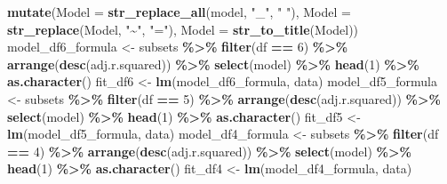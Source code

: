 \documentclass[
  english,
  man,floatsintext]{apa6}
\newenvironment{Shaded}{\begin{snugshade}}{\end{snugshade}}
\newcommand{\DataTypeTok}[1]{\textcolor[rgb]{0.13,0.29,0.53}{#1}}
\newcommand{\DecValTok}[1]{\textcolor[rgb]{0.00,0.00,0.81}{#1}}
\newcommand{\KeywordTok}[1]{\textcolor[rgb]{0.13,0.29,0.53}{\textbf{#1}}}
\newcommand{\NormalTok}[1]{#1}
\newcommand{\OperatorTok}[1]{\textcolor[rgb]{0.81,0.36,0.00}{\textbf{#1}}}
\newcommand{\StringTok}[1]{\textcolor[rgb]{0.31,0.60,0.02}{#1}}
\begin{document}
\begin{Shaded}
\begin{Highlighting}[]
\StringTok{  }\KeywordTok{mutate}\NormalTok{(}\DataTypeTok{Model =} \KeywordTok{str\_replace\_all}\NormalTok{(model, }\StringTok{"\_"}\NormalTok{, }\StringTok{" "}\NormalTok{),}
         \DataTypeTok{Model =} \KeywordTok{str\_replace}\NormalTok{(Model, }\StringTok{"\textasciitilde{}"}\NormalTok{, }\StringTok{"="}\NormalTok{), }
         \DataTypeTok{Model =} \KeywordTok{str\_to\_title}\NormalTok{(Model))}
\NormalTok{model\_df6\_formula \textless{}{-}}\StringTok{ }\NormalTok{subsets }\OperatorTok{\%\textgreater{}\%}\StringTok{ }\KeywordTok{filter}\NormalTok{(df }\OperatorTok{==}\StringTok{ }\DecValTok{6}\NormalTok{) }\OperatorTok{\%\textgreater{}\%}\StringTok{ }
\StringTok{  }\KeywordTok{arrange}\NormalTok{(}\KeywordTok{desc}\NormalTok{(adj.r.squared)) }\OperatorTok{\%\textgreater{}\%}\StringTok{ }
\StringTok{  }\KeywordTok{select}\NormalTok{(model) }\OperatorTok{\%\textgreater{}\%}\StringTok{ }\KeywordTok{head}\NormalTok{(}\DecValTok{1}\NormalTok{) }\OperatorTok{\%\textgreater{}\%}\StringTok{ }\KeywordTok{as.character}\NormalTok{() }
\NormalTok{fit\_df6 \textless{}{-}}\StringTok{ }\KeywordTok{lm}\NormalTok{(model\_df6\_formula, data)}
\NormalTok{model\_df5\_formula \textless{}{-}}\StringTok{ }\NormalTok{subsets }\OperatorTok{\%\textgreater{}\%}\StringTok{ }\KeywordTok{filter}\NormalTok{(df }\OperatorTok{==}\StringTok{ }\DecValTok{5}\NormalTok{) }\OperatorTok{\%\textgreater{}\%}\StringTok{ }
\StringTok{  }\KeywordTok{arrange}\NormalTok{(}\KeywordTok{desc}\NormalTok{(adj.r.squared)) }\OperatorTok{\%\textgreater{}\%}\StringTok{ }
\StringTok{  }\KeywordTok{select}\NormalTok{(model) }\OperatorTok{\%\textgreater{}\%}\StringTok{ }\KeywordTok{head}\NormalTok{(}\DecValTok{1}\NormalTok{) }\OperatorTok{\%\textgreater{}\%}\StringTok{ }\KeywordTok{as.character}\NormalTok{()}
\NormalTok{fit\_df5 \textless{}{-}}\StringTok{ }\KeywordTok{lm}\NormalTok{(model\_df5\_formula, data)}
\NormalTok{model\_df4\_formula \textless{}{-}}\StringTok{ }\NormalTok{subsets }\OperatorTok{\%\textgreater{}\%}\StringTok{ }\KeywordTok{filter}\NormalTok{(df }\OperatorTok{==}\StringTok{ }\DecValTok{4}\NormalTok{) }\OperatorTok{\%\textgreater{}\%}\StringTok{ }
\StringTok{  }\KeywordTok{arrange}\NormalTok{(}\KeywordTok{desc}\NormalTok{(adj.r.squared)) }\OperatorTok{\%\textgreater{}\%}\StringTok{ }
\StringTok{  }\KeywordTok{select}\NormalTok{(model) }\OperatorTok{\%\textgreater{}\%}\StringTok{ }\KeywordTok{head}\NormalTok{(}\DecValTok{1}\NormalTok{) }\OperatorTok{\%\textgreater{}\%}\StringTok{ }\KeywordTok{as.character}\NormalTok{() }
\NormalTok{fit\_df4 \textless{}{-}}\StringTok{ }\KeywordTok{lm}\NormalTok{(model\_df4\_formula, data)}

\end{Highlighting}
\end{Shaded}
\end{document}
